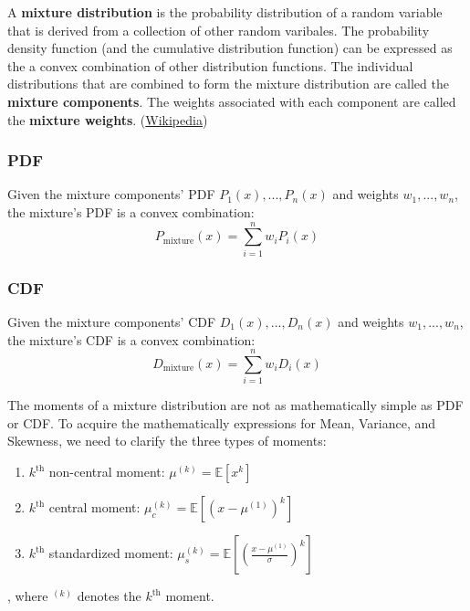 A \textbf{mixture distribution} is the probability distribution of a random variable 
that is derived from a collection of other random varibales. 
The probability density function (and the cumulative distribution function) 
can be expressed as the a convex combination of other distribution functions.
The individual distributions that are combined to form the mixture distribution are called 
the \textbf{mixture components}. The weights associated with each component are called the \textbf{mixture weights}.
(\href{https://www.overleaf.com/learn/latex/Bold,_italics_and_underlining}{Wikipedia})


\subsubsection*{PDF}
Given the mixture components' PDF ${P_1(x), ..., P_n(x)}$ and weights ${w_1,...,w_n}$,
the mixture's PDF is a convex combination:
\[
    P_\text{mixture}(x) = \sum^n_{i=1} w_i P_i(x)
\]

\subsubsection*{CDF}
Given the mixture components' CDF ${D_1(x), ..., D_n(x)}$ and weights ${w_1,...,w_n}$,
the mixture's CDF is a convex combination:
\[
    D_\text{mixture}(x) = \sum^n_{i=1} w_i D_i(x)
\]


The moments of a mixture distribution are not as mathematically simple as PDF or CDF. 
To acquire the mathematically expressions for Mean, Variance, and Skewness, we need to 
clarify the three types of moments:
\begin{enumerate}
    \item $k^\text{th}$ non-central moment: $\mu^{(k)} = \mathbb{E}[x^k]$
    \item $k^\text{th}$ central moment: $\mu^{(k)}_c = \mathbb{E}[(x-\mu^{(1)})^k]$
    \item $k^\text{th}$ standardized moment: $\mu^{(k)}_s = \mathbb{E}[(\frac{x-\mu^{(1)}}{\sigma})^k]$
\end{enumerate}
, where $^{(k)}$ denotes the $k^\text{th}$ moment.



